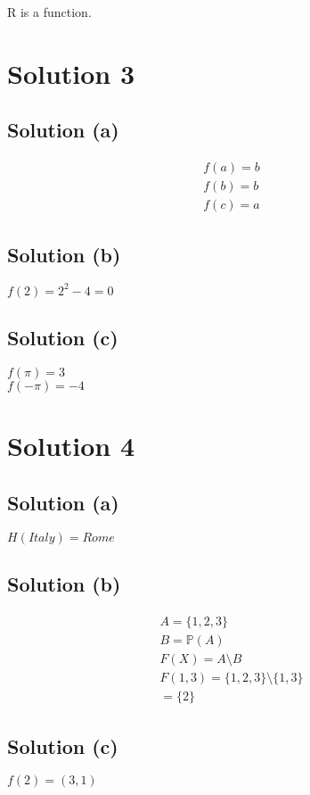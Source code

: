 \documentclass{article}
\begin{document}
R is a function.

\section{Solution 3}
\subsection{Solution (a)}
\begin{align*}
  f(a) = b \\
  f(b) = b \\
  f(c) = a
\end{align*}

\subsection{Solution (b)}
$f(2) = 2^2 - 4 = 0$

\subsection{Solution (c)}
$f(\pi) = 3$ \\
$f(-\pi) = -4$

\section{Solution 4}
\subsection{Solution (a)}
$H(Italy) = Rome$

\subsection{Solution (b)}
\begin{align*}
  A = \{1,2,3\} \\
  B = \mathbb{P}(A) \\
  F(X) = A \setminus B \\
  F({1,3}) = \{1,2,3\} \setminus \{1,3\} \\
           = \{2\}
\end{align*}

\subsection{Solution (c)}
$f(2) = (3,1)$
\end{document}
